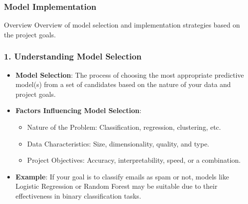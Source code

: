 \documentclass[aspectratio=169]{beamer}
\begin{document}
\begin{frame}
    \frametitle{Model Implementation}
    \begin{block}{Overview}
        Overview of model selection and implementation strategies based on the project goals.
    \end{block}
\end{frame}

\begin{frame}
    \frametitle{1. Understanding Model Selection}
    \begin{itemize}
        \item \textbf{Model Selection}: The process of choosing the most appropriate predictive model(s) from a set of candidates based on the nature of your data and project goals.
        
        \item \textbf{Factors Influencing Model Selection}:
        \begin{itemize}
            \item Nature of the Problem: Classification, regression, clustering, etc.
            \item Data Characteristics: Size, dimensionality, quality, and type.
            \item Project Objectives: Accuracy, interpretability, speed, or a combination.
        \end{itemize}
        
        \item \textbf{Example}: If your goal is to classify emails as spam or not, models like Logistic Regression or Random Forest may be suitable due to their effectiveness in binary classification tasks.
    \end{itemize}
\end{frame}
\end{document}
